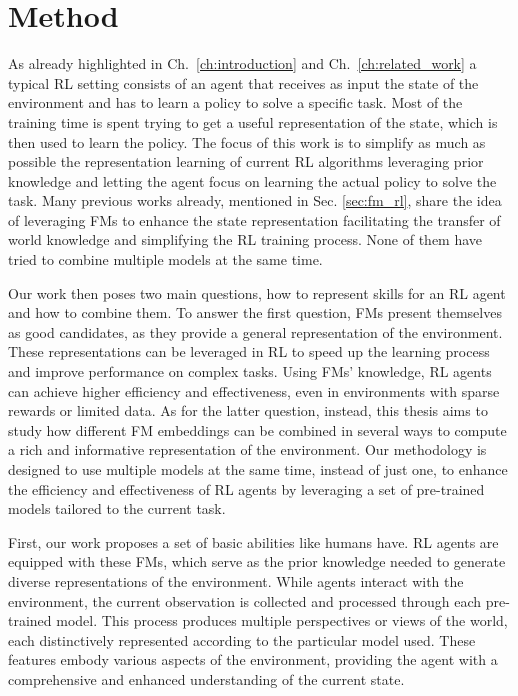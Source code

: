 
\chapter{Method}
\label{ch:method}
As already highlighted in Ch.~\ref{ch:introduction} and Ch.~\ref{ch:related_work}
a typical RL setting consists of an agent that receives as input the state of the environment and has to learn a policy to solve a specific task.
Most of the training time is spent trying to get a useful representation of the state, which is then used to learn the policy.
The focus of this work is to simplify as much as possible the representation learning of current RL algorithms leveraging prior knowledge and letting the agent focus on learning the actual policy to solve the task.
Many previous works already, mentioned in Sec. \ref{sec:fm_rl}, share the idea of leveraging FMs to enhance the state representation facilitating the transfer of world knowledge and simplifying the RL training process.
None of them have tried to combine multiple models at the same time.

Our work then poses two main questions, how to represent skills for an RL agent and how to combine them.
To answer the first question, FMs present themselves as good candidates, as they provide a general representation of the environment.
These representations can be leveraged in RL to speed up the learning process and improve performance on complex tasks.
Using FMs' knowledge, RL agents can achieve higher efficiency and effectiveness, even in environments with sparse rewards or limited data.
As for the latter question, instead, this thesis aims to study how different FM embeddings can be combined in several ways to compute a rich and informative representation of the environment.
Our methodology is designed to use multiple models at the same time, instead of just one, to enhance the efficiency and effectiveness of RL agents by leveraging a set of pre-trained models tailored to the current task.


First, our work proposes a set of basic abilities like humans have.
RL agents are equipped with these FMs, which serve as the prior knowledge needed to generate diverse representations of the environment.
While agents interact with the environment, the current observation is collected and processed through each pre-trained model.
This process produces multiple perspectives or views of the world, each distinctively represented according to the particular model used.
These features embody various aspects of the environment, providing the agent with a comprehensive and enhanced understanding of the current state.

